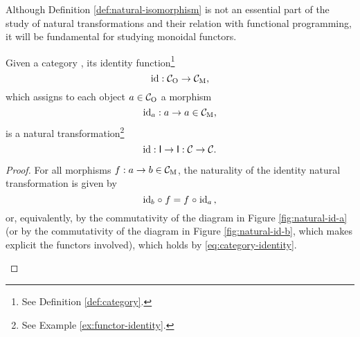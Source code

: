 Although Definition \ref{def:natural-isomorphism} is not an essential
part of the study of natural transformations and their relation with
functional programming, it will be fundamental for studying monoidal
functors.


\begin{example}
  [Identity]

  \label{ex:natural-identity}

  Given a category , its identity function\footnote{See
    Definition \ref{def:category}.}
  \begin{equation*}
    \operatorname{id}: \mathcal{C}_{\operatorname{O}} \to \mathcal{C}_{\operatorname{M}}
    \text{,}
  \end{equation*}
  which assigns to each object $a \in \mathcal{C}_{\operatorname{O}}$ a morphism
  \begin{equation*}
    \operatorname{id}_{a}: a \to a \in \mathcal{C}_{\operatorname{M}}
    \text{,}
  \end{equation*}
  is a natural transformation\footnote{See Example
    \ref{ex:functor-identity}.}
  \begin{equation*}
    \operatorname{id}: \mathsf{I} \to \mathsf{I}: \mathcal{C} \to \mathcal{C}
    \text{.}
  \end{equation*}
  \begin{proof}
    For all morphisms $f: a \to b \in \mathcal{C}_{\operatorname{M}}$, the naturality of the
    identity natural transformation is given by
    \begin{equation*}
      \operatorname{id}_{b} \mathrel{\circ} f = f \mathrel{\circ} \operatorname{id}_{a}
      \text{,}
    \end{equation*}
    or, equivalently, by the commutativity of the diagram in Figure
    \ref{fig:natural-id-a} (or by the commutativity of the diagram in
    Figure \ref{fig:natural-id-b}, which makes explicit the functors
    involved), which holds by \eqref{eq:category-identity}.
    \begin{figure}[htbp]
      \begin{subfigure}[b]{0.5\linewidth}
        \begin{center}
\end{center}
\end{subfigure}
\end{figure}
\end{proof}
\end{example}
